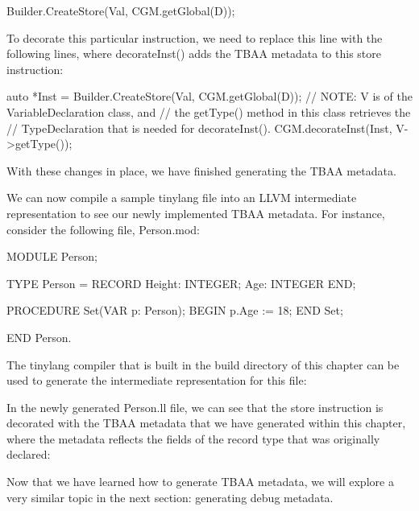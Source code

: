 \begin{cpp}
    Builder.CreateStore(Val, CGM.getGlobal(D));
\end{cpp}

To decorate this particular instruction, we need to replace this line with the following lines, where decorateInst() adds the TBAA metadata to this store instruction:

\begin{cpp}
    auto *Inst = Builder.CreateStore(Val, CGM.getGlobal(D));
    // NOTE: V is of the VariableDeclaration class, and
    // the getType() method in this class retrieves the
    // TypeDeclaration that is needed for decorateInst().
    CGM.decorateInst(Inst, V->getType());
\end{cpp}

With these changes in place, we have finished generating the TBAA metadata.

We can now compile a sample tinylang file into an LLVM intermediate representation to see our newly implemented TBAA metadata. For instance, consider the following file, Person.mod:

\begin{shell}
MODULE Person;

TYPE
    Person = RECORD
                Height: INTEGER;
                Age: INTEGER
             END;

PROCEDURE Set(VAR p: Person);
BEGIN
    p.Age := 18;
END Set;

END Person.
\end{shell}

The tinylang compiler that is built in the build directory of this chapter can be used to generate the intermediate representation for this file:


In the newly generated Person.ll file, we can see that the store instruction is decorated with the TBAA metadata that we have generated within this chapter, where the metadata reflects the fields of the record type that was originally declared:


Now that we have learned how to generate TBAA metadata, we will explore a very similar topic in the next section: generating debug metadata.

























